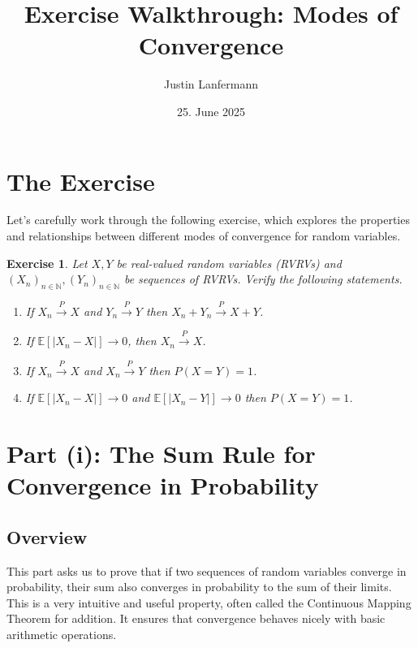 \documentclass[11pt,a4paper]{article}
\title{\vspace{-2em}Exercise Walkthrough: Modes of Convergence}
\author{Justin Lanfermann}
\date{25. June 2025}
\theoremstyle{exercise}
\newtheorem{exercise}{Exercise}
\begin{document}
\maketitle
\thispagestyle{empty}
\newpage

\section*{The Exercise}

Let's carefully work through the following exercise, which explores the properties and relationships between different modes of convergence for random variables.

\begin{exercise}
Let $X, Y$ be real-valued random variables (RVRVs) and $(X_n)_{n\in\mathbb{N}}, (Y_n)_{n\in\mathbb{N}}$ be sequences of RVRVs. Verify the following statements.
\begin{enumerate}
    \item If $X_n \xrightarrow{P} X$ and $Y_n \xrightarrow{P} Y$ then $X_n + Y_n \xrightarrow{P} X + Y$.
    \item If $\mathbb{E}[|X_n - X|] \to 0$, then $X_n \xrightarrow{P} X$.
    \item If $X_n \xrightarrow{P} X$ and $X_n \xrightarrow{P} Y$ then $P(X = Y) = 1$.
    \item If $\mathbb{E}[|X_n - X|] \to 0$ and $\mathbb{E}[|X_n - Y|] \to 0$ then $P(X = Y) = 1$.
\end{enumerate}
\end{exercise}

\newpage

\section*{Part (i): The Sum Rule for Convergence in Probability}

\subsection*{Overview}
This part asks us to prove that if two sequences of random variables converge in probability, their sum also converges in probability to the sum of their limits. This is a very intuitive and useful property, often called the Continuous Mapping Theorem for addition. It ensures that convergence behaves nicely with basic arithmetic operations.
\end{document}
